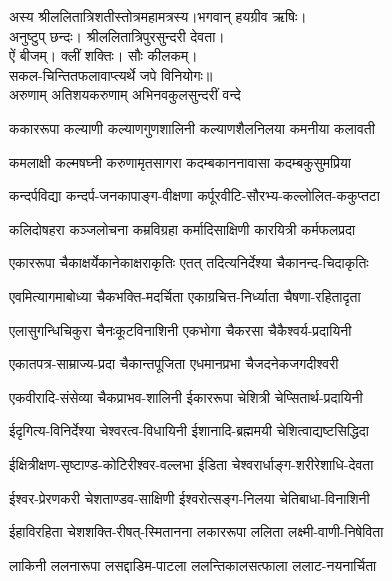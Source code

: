 
अस्य  श्रीललितात्रिशतीस्तोत्रमहामत्रस्य।भगवान्  हयग्रीव  ऋषिः। \\
अनुष्टुप्  छन्दः। श्रीललितात्रिपुरसुन्दरी  देवता।\\
ऐं  बीजम्।  क्लीं  शक्तिः।  सौः  कीलकम्।\\
सकल-चिन्तितफलावाप्त्यर्थे  जपे  विनियोगः॥\\

{अरुणाम्  अतिशयकरुणाम्  अभिनवकुलसुन्दरीं  वन्दे}

\twolineshloka
{ककाररूपा कल्याणी कल्याणगुणशालिनी}
{कल्याणशैलनिलया कमनीया कलावती}

\twolineshloka
{कमलाक्षी कल्मषघ्नी करुणामृतसागरा}
{कदम्बकाननावासा कदम्बकुसुमप्रिया}

\twolineshloka
{कन्दर्पविद्या कन्दर्प-जनकापाङ्ग-वीक्षणा}
{कर्पूरवीटि-सौरभ्य-कल्लोलित-ककुप्तटा}

\twolineshloka
{कलिदोषहरा कञ्जलोचना कम्रविग्रहा}
{कर्मादिसाक्षिणी कारयित्री कर्मफलप्रदा}

\twolineshloka
{एकाररूपा चैकाक्षर्येकानेकाक्षराकृतिः}
{एतत् तदित्यनिर्देश्या चैकानन्द-चिदाकृतिः}

\twolineshloka
{एवमित्यागमाबोध्या चैकभक्ति-मदर्चिता}
{एकाग्रचित्त-निर्ध्याता चैषणा-रहितादृता}

\twolineshloka
{एलासुगन्धिचिकुरा चैनःकूटविनाशिनी}
{एकभोगा चैकरसा चैकैश्वर्य-प्रदायिनी}

\twolineshloka
{एकातपत्र-साम्राज्य-प्रदा चैकान्तपूजिता}
{एधमानप्रभा चैजदनेकजगदीश्वरी}

\twolineshloka
{एकवीरादि-संसेव्या चैकप्राभव-शालिनी}
{ईकाररूपा चेशित्री चेप्सितार्थ-प्रदायिनी}

\twolineshloka
{ईदृगित्य-विनिर्देश्या चेश्वरत्व-विधायिनी}
{ईशानादि-ब्रह्ममयी चेशित्वाद्यष्टसिद्धिदा}

\twolineshloka
{ईक्षित्रीक्षण-सृष्टाण्ड-कोटिरीश्वर-वल्लभा}
{ईडिता चेश्वरार्धाङ्ग-शरीरेशाधि-देवता}

\twolineshloka
{ईश्वर-प्रेरणकरी चेशताण्डव-साक्षिणी}
{ईश्वरोत्सङ्ग-निलया चेतिबाधा-विनाशिनी}

\twolineshloka
{ईहाविरहिता चेशशक्ति-रीषत्‌-स्मितानना}
{लकाररूपा ललिता लक्ष्मी-वाणी-निषेविता}

\twolineshloka
{लाकिनी ललनारूपा लसद्दाडिम-पाटला}
{ललन्तिकालसत्फाला ललाट-नयनार्चिता}

